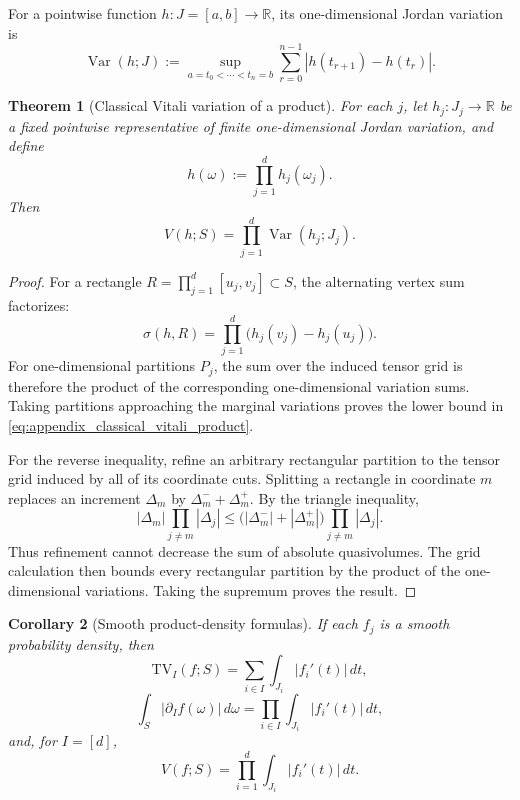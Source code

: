 \documentclass[11pt,letterpaper]{article}
\newtheorem{theorem}{Theorem}[section]
\newtheorem{corollary}[theorem]{Corollary}
\theoremstyle{definition}
\theoremstyle{remark}
\newcommand{\TV}{\mathrm{TV}}
\begin{document}
For a pointwise function $h:J=[a,b]\to\mathbb R$, its
one-dimensional Jordan variation is
$$
\operatorname{Var}(h;J)
:=
\sup_{a=t_0<\cdots<t_n=b}
\sum_{r=0}^{n-1}|h(t_{r+1})-h(t_r)|.
$$

\begin{theorem}[Classical Vitali variation of a product]
\label{thm:appendix_classical_vitali_product}
For each $j$, let $h_j:J_j\to\mathbb R$ be a fixed pointwise representative
of finite one-dimensional Jordan variation, and define
$$
h(\omega):=\prod_{j=1}^d h_j(\omega_j).
$$
Then
\begin{equation}
\label{eq:appendix_classical_vitali_product}
V(h;S)
=
\prod_{j=1}^d\operatorname{Var}(h_j;J_j).
\end{equation}
\end{theorem}

\begin{proof}
For a rectangle $R=\prod_{j=1}^d[u_j,v_j]\subset S$, the alternating vertex
sum factorizes:
\begin{equation}
\label{eq:appendix_product_quasivolume}
\sigma(h,R)
=
\prod_{j=1}^d\bigl(h_j(v_j)-h_j(u_j)\bigr).
\end{equation}
For one-dimensional partitions $P_j$, the sum over the induced tensor grid is
therefore the product of the corresponding one-dimensional variation sums.
Taking partitions approaching the marginal variations proves the lower bound
in \eqref{eq:appendix_classical_vitali_product}.

For the reverse inequality, refine an arbitrary rectangular partition to the
tensor grid induced by all of its coordinate cuts. Splitting a rectangle in
coordinate $m$ replaces an increment $\Delta_m$ by
$\Delta_m^-+\Delta_m^+$. By the triangle inequality,
$$
|\Delta_m|\prod_{j\neq m}|\Delta_j|
\le
\bigl(|\Delta_m^-|+|\Delta_m^+|\bigr)
\prod_{j\neq m}|\Delta_j|.
$$
Thus refinement cannot decrease the sum of absolute quasivolumes. The grid
calculation then bounds every rectangular partition by the product of the
one-dimensional variations. Taking the supremum proves the result.
\end{proof}

\begin{corollary}[Smooth product-density formulas]
\label{cor:appendix_smooth_product_density_formulas}
If each $f_j$ is a smooth probability density, then
\begin{equation}
\label{eq:appendix_smooth_product_TVI}
\TV_I(f;S)
=
\sum_{i\in I}\int_{J_i}|f_i'(t)|\,dt,
\end{equation}
\begin{equation}
\label{eq:appendix_smooth_product_mixed}
\int_S|\partial_I f(\omega)|\,d\omega
=
\prod_{i\in I}\int_{J_i}|f_i'(t)|\,dt,
\end{equation}
and, for $I=[d]$,
\begin{equation}
\label{eq:appendix_smooth_product_vitali}
V(f;S)
=
\prod_{i=1}^d\int_{J_i}|f_i'(t)|\,dt.
\end{equation}
\end{corollary}
\end{document}
